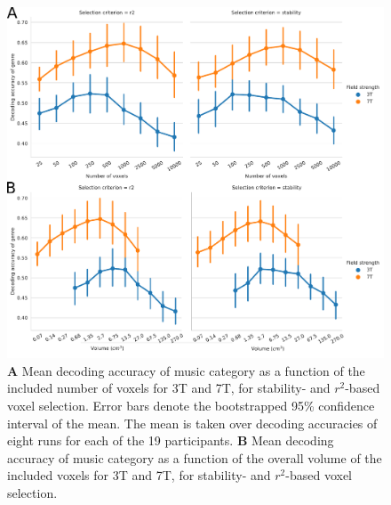 \begin{figure}
  \centering
  \includegraphics[width=\linewidth]{pics/decoding_genre.pdf}

  \caption{\textbf{A} Mean decoding accuracy of music category as a function of
  the included number of voxels for 3T and 7T, for stability- and
  $r^2$-based voxel selection. Error bars denote the bootstrapped 95\%
  confidence interval of the mean. The mean is taken over decoding
  accuracies of eight runs for each of the 19 participants. \textbf{B} Mean
decoding accuracy of music category as a function of the overall volume of the
included voxels for 3T and 7T, for stability- and $r^2$-based voxel
selection.
}

 \label{fig:decoding_accuracy}
\end{figure}

